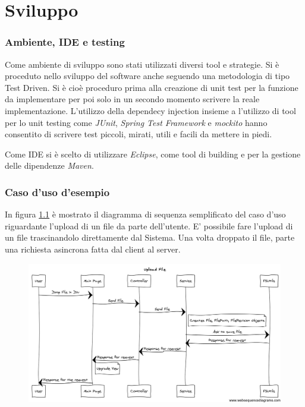 \chapter{Sviluppo}

\subsection{Ambiente, IDE e testing}

Come ambiente di sviluppo sono stati utilizzati diversi tool e
strategie.  Si è proceduto nello sviluppo del software anche seguendo
una metodologia di tipo Test Driven. Si è cioè proceduro prima alla
creazione di unit test per la funzione da implementare per poi solo in
un secondo momento scrivere la reale implementazione. L'utilizzo della
dependecy injection insieme a l'utilizzo di tool per lo unit testing
come \emph{JUnit}, \emph{Spring Test Framework} e \emph{mockito} hanno consentito di
scrivere test piccoli, mirati, utili e facili da mettere in piedi.

Come IDE si è scelto di utilizzare \emph{Eclipse}, come
tool di building e per la gestione delle dipendenze \emph{Maven}.

\subsection{Caso d'uso d'esempio}

In figura \ref{upload} è mostrato il diagramma di sequenza
semplificato del caso d'uso riguardante l'upload di un file da parte
dell'utente. E' possibile fare l'upload di un file trascinandolo
direttamente dal Sistema. Una volta droppato il file, parte una
richiesta asincrona fatta dal client al server. 



\begin{figure}
  \includegraphics[scale=0.4]{upload}
  \caption{}
  \label{upload}
\end{figure}

